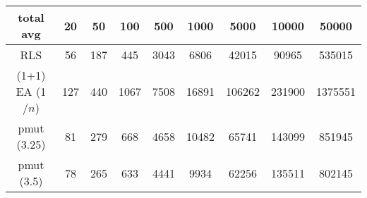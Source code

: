 \begin{tabular}[h]{ccccccccc}
total avg&20&50&100&500&1000&5000&10000&50000\\\hline
RLS&56&187&445&3043&6806&42015&90965&535015\\
(1+1) EA (1$/n$)&127&440&1067&7508&16891&106262&231900&1375551\\
pmut (3.25)&81&279&668&4658&10482&65741&143099&851945\\
pmut (3.5)&78&265&633&4441&9934&62256&135511&802145\\
\end{tabular}

